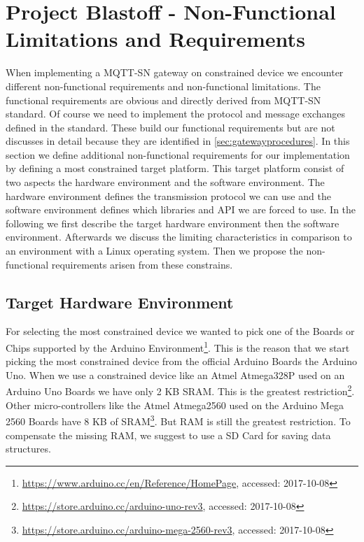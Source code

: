 \section{Project Blastoff - Non-Functional Limitations and  Requirements}\label{sec:nonfunctionallimitationsandrequirements}
When implementing a MQTT-SN gateway on constrained device we encounter different non-functional requirements and non-functional limitations.
The functional requirements are obvious and directly derived from MQTT-SN standard.
Of course we need to implement the protocol and message exchanges defined in the standard.
These build our functional requirements but are not discusses in detail because they are identified in \autoref{sec:gatewayprocedures}.
In this section we define additional non-functional requirements for our implementation by defining a most constrained target platform.
This target platform consist of two aspects the hardware environment and the software environment.
The hardware environment defines the transmission protocol we can use and the software environment defines which libraries and API we are forced to use.
In the following we first describe the target hardware environment then the software environment.
Afterwards we discuss the limiting characteristics in comparison to an environment with a Linux operating system.
Then we propose the non-functional requirements arisen from these constrains.

\subsection{Target Hardware Environment}\label{subsec:targethardwareenvironment}
For selecting the most constrained device we wanted to pick one of the Boards or Chips supported by the Arduino Environment\footnote{\url{https://www.arduino.cc/en/Reference/HomePage}, accessed: 2017-10-08}.
This is the reason that we start picking the most constrained device from the official Arduino Boards the Arduino Uno.
When we use a constrained device like an Atmel Atmega328P used on an Arduino Uno Boards we have only 2 KB SRAM. This is the greatest restriction\footnote{\url{https://store.arduino.cc/arduino-uno-rev3}, accessed: 2017-10-08}.
Other micro-controllers like the Atmel Atmega2560 used on the Arduino Mega 2560 Boards have 8 KB of SRAM\footnote{\url{https://store.arduino.cc/arduino-mega-2560-rev3}, accessed: 2017-10-08}.
But RAM is still the greatest restriction.
To compensate the missing RAM, we suggest to use a SD Card for saving data structures.

